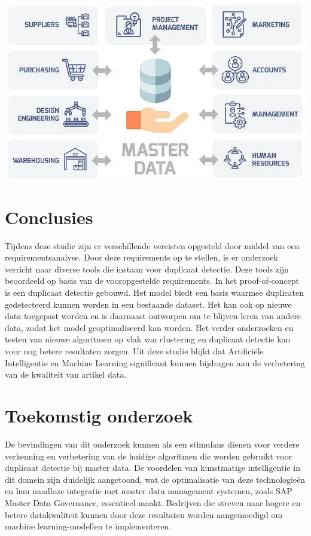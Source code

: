 \documentclass[a0,portrait]{hogent-poster}
\begin{document}
\begin{multicols}{2}


\begin{center}
  \captionsetup{type=figure}
  \includegraphics[width=1.0\linewidth]{../images/Master-Data.png}
\end{center}


\section{Conclusies}

Tijdens deze studie zijn er verschillende vereisten opgesteld door middel van een requirementsanalyse. Door deze requirements op te stellen, is er onderzoek verricht naar diverse tools die instaan voor duplicaat detectie. Deze tools zijn beoordeeld op basis van de vooropgestelde requirements. In het proof-of-concept is een duplicaat detectie gebouwd. Het model biedt een basis waarmee duplicaten gedetecteerd kunnen worden in een bestaande dataset. Het kan ook op nieuwe data toegepast worden en is daarnaast ontworpen om te blijven leren van andere data, zodat het model geoptimaliseerd kan worden. Het verder onderzoeken en testen van nieuwe algoritmen op vlak van clustering en duplicaat detectie kan voor nog betere resultaten zorgen. Uit deze studie blijkt dat Artificiële Intelligentie en Machine Learning significant kunnen bijdragen aan de verbetering van de kwaliteit van artikel data. 

\section{Toekomstig onderzoek}

De bevindingen van dit onderzoek kunnen als een stimulans dienen voor verdere verkenning en verbetering van de huidige algoritmen die worden gebruikt voor duplicaat detectie bij master data. De voordelen van kunstmatige intelligentie in dit domein zijn duidelijk aangetoond, wat de optimalisatie van deze technologieën en hun naadloze integratie met master data management systemen, zoals SAP Master Data Governance, essentieel maakt. Bedrijven die streven naar hogere en betere datakwaliteit kunnen door deze resultaten worden aangemoedigd om machine learning-modellen te implementeren. 

\end{multicols}
\end{document}
